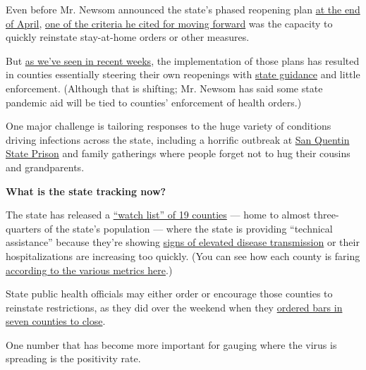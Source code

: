Even before Mr. Newsom announced the state's phased reopening plan
\href{https://www.nytimes3xbfgragh.onion/2020/04/29/us/california-reopen-coronavirus.html}{at
the end of April},
\href{https://www.nytimes3xbfgragh.onion/2020/04/15/us/coronavirus-california-quarantine-end.html}{one
of the criteria he cited for moving forward} was the capacity to quickly
reinstate stay-at-home orders or other measures.

But
\href{https://www.nytimes3xbfgragh.onion/2020/06/29/us/california-coronavirus-reopening.html?smtyp=cur\&smid=tw-nytnational}{as
we've seen in recent weeks}, the implementation of those plans has
resulted in counties essentially steering their own reopenings with
\href{https://covid19.ca.gov/industry-guidance/\#top}{state guidance}
and little enforcement. (Although that is shifting; Mr. Newsom has said
some state pandemic aid will be tied to counties' enforcement of health
orders.)

One major challenge is tailoring responses to the huge variety of
conditions driving infections across the state, including a horrific
outbreak at
\href{https://www.marinij.com/2020/06/29/marin-asks-newsom-to-intervene-in-san-quentin-outbreak/}{San
Quentin State Prison} and family gatherings where people forget not to
hug their cousins and grandparents.

\textbf{What is the state tracking now?}

The state has released a
\href{https://www.cdph.ca.gov/Programs/CID/DCDC/Pages/COVID-19/CountyMonitoringDataStep2.aspx}{``watch
list'' of 19 counties} --- home to almost three-quarters of the state's
population --- where the state is providing ``technical assistance''
because they're showing
\href{https://www.cdph.ca.gov/Programs/CID/DCDC/Pages/COVID-19/COVID19CountyDataTable.aspx}{signs
of elevated disease transmission} or their hospitalizations are
increasing too quickly. (You can see how each county is faring
\href{https://www.cdph.ca.gov/Programs/CID/DCDC/Pages/COVID-19/COVID19CountyDataTable.aspx}{according
to the various metrics here}.)

State public health officials may either order or encourage those
counties to reinstate restrictions, as they did over the weekend when
they
\href{https://www.cdph.ca.gov/Programs/CID/DCDC/Pages/COVID-19/Bar-Closure-Guidance.aspx}{ordered
bars in seven counties to close}.

One number that has become more important for gauging where the virus is
spreading is the positivity rate.

